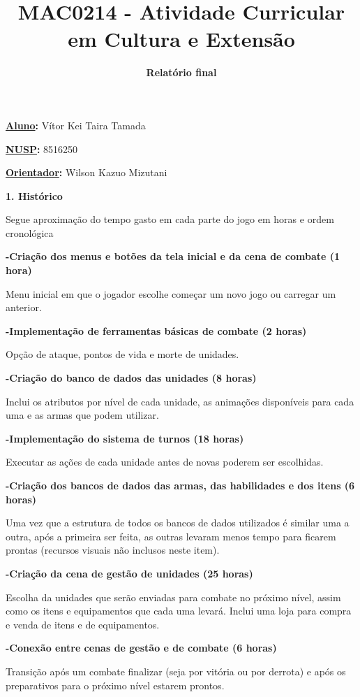 \documentclass{article}
\title{\textbf{MAC0214 - Atividade Curricular em Cultura e Extensão}}
\author{\textbf{Relatório final}}
\date{ }
\begin{document}
\maketitle

\textbf{\underline{Aluno}:} Vítor Kei Taira Tamada

\textbf{\underline{NUSP}:} 8516250

\bigskip
\textbf{\underline{Orientador}:} Wilson Kazuo Mizutani

\bigskip
\textbf{\large{1. Histórico}}

\quad Segue aproximação do tempo gasto em cada parte do jogo em horas e ordem cronológica

\bigskip
\quad\textbf{-Criação dos menus e botões da tela inicial e da cena de combate (1 hora)}

\qquad Menu inicial em que o jogador escolhe começar um novo jogo ou carregar um anterior.

\bigskip
\quad\textbf{-Implementação de ferramentas básicas de combate (2 horas)}

\qquad Opção de ataque, pontos de vida e morte de unidades.

\bigskip
\quad\textbf{-Criação do banco de dados das unidades (8 horas)}

\qquad Inclui os atributos por nível de cada unidade, as animações disponíveis para cada uma e as armas que podem utilizar.

\bigskip
\quad\textbf{-Implementação do sistema de turnos (18 horas)}

\qquad Executar as ações de cada unidade antes de novas poderem ser escolhidas.

\bigskip
\quad\textbf{-Criação dos bancos de dados das armas, das habilidades e dos itens (6 horas)}

\qquad Uma vez que a estrutura de todos os bancos de dados utilizados é similar uma a outra, após a primeira ser feita, as outras levaram menos tempo para ficarem prontas (recursos visuais não inclusos neste item).

\bigskip
\quad\textbf{-Criação da cena de gestão de unidades (25 horas)}

\qquad Escolha da unidades que serão enviadas para combate no próximo nível, assim como os itens e equipamentos que cada uma levará. Inclui uma loja para compra e venda de itens e de equipamentos.

\bigskip
\quad\textbf{-Conexão entre cenas de gestão e de combate (6 horas)}

\qquad Transição após um combate finalizar (seja por vitória ou por derrota) e após os preparativos para o próximo nível estarem prontos.
\end{document}
